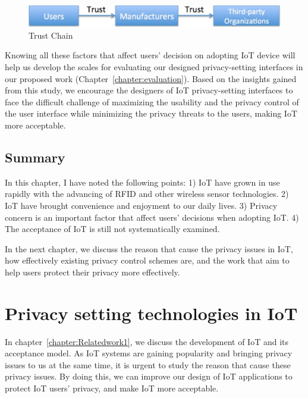 \begin{figure}
	\centering
	\includegraphics[width=0.75\columnwidth]{figures/trustchain.pdf}
	\caption{Trust Chain}
	\label{fig:trustchain}
\end{figure}

Knowing all these factors that affect users' decision on adopting IoT device will help us develop the scales for evaluating our designed privacy-setting interfaces in our proposed work (Chapter~\ref{chapter:evaluation}). Based on the insights gained from this study, we encourage the designers of IoT privacy-setting interfaces to face the difficult challenge of maximizing the usability and the privacy control of the user interface while minimizing the privacy threats to the users, making IoT more acceptable.

\section{Summary}
In this chapter, I have noted the following points: 1) IoT have grown in use rapidly with the advancing of RFID and other wireless sensor technologies. 2) IoT have brought convenience and enjoyment to our daily lives. 3) Privacy concern is an important factor that affect users' decisions when adopting IoT. 4) The acceptance of IoT is still not systematically examined.


In the next chapter, we discuss the reason that cause the privacy issues in IoT, how effectively existing privacy control schemes are, and the work that aim to help users protect their privacy more effectively.



















\chapter{Privacy setting technologies in IoT}\label{chapter:Relatedwork2}
In chapter~\ref{chapter:Relatedwork1}, we discuss the development of IoT and its acceptance model. As IoT systems are gaining popularity and bringing privacy issues to us at the same time, it is urgent to study the reason that cause these privacy issues. By doing this, we can improve our design of IoT applications to protect IoT users' privacy, and make IoT more acceptable.

